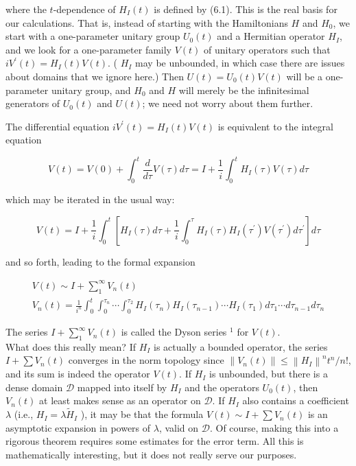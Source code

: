 \documentclass[10pt, letterpaper]{article}
\begin{document}
where the $t$-dependence of $H_{I}(t)$ is defined by (6.1). This is the real basis for our calculations. That is, instead of starting with the Hamiltonians $H$ and $H_{0}$, we start with a one-parameter unitary group $U_{0}(t)$ and a Hermitian operator $H_{I}$, and we look for a one-parameter family $V(t)$ of unitary operators such that $i V^{\prime}(t)=H_{I}(t) V(t)$. ( $H_{I}$ may be unbounded, in which case there are issues about domains that we ignore here.) Then $U(t)=U_{0}(t) V(t)$ will be a one-parameter unitary group, and $H_{0}$ and $H$ will merely be the infinitesimal generators of $U_{0}(t)$ and $U(t)$; we need not worry about them further.

The differential equation $i V^{\prime}(t)=H_{I}(t) V(t)$ is equivalent to the integral equation

$$
V(t)=V(0)+\int_{0}^{t} \frac{d}{d \tau} V(\tau) d \tau=I+\frac{1}{i} \int_{0}^{t} H_{I}(\tau) V(\tau) d \tau
$$

which may be iterated in the usual way:

$$
V(t)=I+\frac{1}{i} \int_{0}^{t}\left[H_{I}(\tau) d \tau+\frac{1}{i} \int_{0}^{\tau} H_{I}(\tau) H_{I}\left(\tau^{\prime}\right) V\left(\tau^{\prime}\right) d \tau^{\prime}\right] d \tau
$$

and so forth, leading to the formal expansion

$$
\begin{gathered}
V(t) \sim I+\sum_{1}^{\infty} V_{n}(t) \\
V_{n}(t)=\frac{1}{i^{n}} \int_{0}^{t} \int_{0}^{\tau_{n}} \cdots \int_{0}^{\tau_{2}} H_{I}\left(\tau_{n}\right) H_{I}\left(\tau_{n-1}\right) \cdots H_{I}\left(\tau_{1}\right) d \tau_{1} \cdots d \tau_{n-1} d \tau_{n}
\end{gathered}
$$

The series $I+\sum_{1}^{\infty} V_{n}(t)$ is called the Dyson series ${ }^{1}$ for $V(t)$.\\
What does this really mean? If $H_{I}$ is actually a bounded operator, the series $I+\sum V_{n}(t)$ converges in the norm topology since $\left\|V_{n}(t)\right\| \leq\left\|H_{I}\right\|^{n} t^{n} / n!$, and its sum is indeed the operator $V(t)$. If $H_{I}$ is unbounded, but there is a dense domain $\mathcal{D}$ mapped into itself by $H_{I}$ and the operators $U_{0}(t)$, then $V_{n}(t)$ at least makes sense as an operator on $\mathcal{D}$. If $H_{I}$ also contains a coefficient $\lambda$ (i.e., $H_{I}=\lambda \widetilde{H}_{I}$ ), it may be that the formula $V(t) \sim I+\sum V_{n}(t)$ is an asymptotic expansion in powers of $\lambda$, valid on $\mathcal{D}$. Of course, making this into a rigorous theorem requires some estimates for the error term. All this is mathematically interesting, but it does not really serve our purposes.
\end{document}
